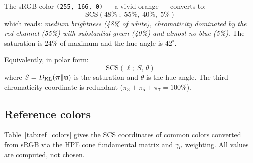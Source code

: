 \documentclass[12pt,a4paper]{article}
\begin{document}
\begin{example}
The sRGB color \texttt{(255, 166, 0)} --- a vivid orange --- converts
to:
\[
  \mathrm{SCS}(48\%\;;\; 55\%,\; 40\%,\; 5\%)
\]
which reads: \emph{medium brightness (48\% of white), chromaticity
dominated by the red channel (55\%) with substantial green (40\%)
and almost no blue (5\%)}. The saturation is $24\%$ of maximum and
the hue angle is $42^\circ$.
\end{example}

Equivalently, in polar form:
\begin{equation}
  \mathrm{SCS}(\ell;\; S,\, \theta)
\end{equation}
where $S = D_{\mathrm{KL}}(\bm{\pi}\|\mathbf{u})$ is the saturation and $\theta$
is the hue angle. The third chromaticity coordinate is redundant
($\pi_3 + \pi_5 + \pi_7 = 100\%$).

\subsection{Reference colors}

Table~\ref{tab:ref_colors} gives the SCS coordinates of common colors
converted from sRGB via the HPE cone fundamental matrix and $\gamma_{p}$
weighting. All values are computed, not chosen.
\end{document}
